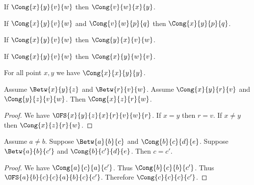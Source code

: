\documentclass[10pt,a4paper,parskip=half,numbers=endperiod,parskip]{scrartcl}
\begin{document}
  \begin{forthel}
    \begin{lemma} %
      If $\Cong{x}{y}{v}{w}$
      then $\Cong{v}{w}{x}{y}$.
    \end{lemma}
  \end{forthel}


  \begin{forthel}
    \begin{lemma} %
      If $\Cong{x}{y}{v}{w}$ and $\Cong{v}{w}{p}{q}$
      then $\Cong{x}{y}{p}{q}$.
    \end{lemma}
  \end{forthel}

  \begin{forthel}
    \begin{lemma} %
      If $\Cong{x}{y}{v}{w}$
      then $\Cong{y}{x}{v}{w}$.
    \end{lemma}

    \begin{lemma} %
      If $\Cong{x}{y}{v}{w}$
      then $\Cong{x}{y}{w}{v}$.
    \end{lemma}
  \end{forthel}

  \begin{forthel}
    \begin{lemma} %
      For all point $x, y$ we have $\Cong{x}{x}{y}{y}$.
    \end{lemma}
  \end{forthel}


  \begin{forthel}
    \begin{lemma} %
      Assume $\Betw{x}{y}{z}$ and $\Betw{r}{v}{w}$.
      Assume $\Cong{x}{y}{r}{v}$ and $\Cong{y}{z}{v}{w}$.
      Then $\Cong{x}{z}{r}{w}$.
    \end{lemma}
    \begin{proof}
      We have $\OFS{x}{y}{z}{x}{r}{v}{w}{r}$. %
      If $x = y$ then $r = v$.                %
      If $x \neq y$ then $\Cong{x}{z}{r}{w}$. %
    \end{proof}
  \end{forthel}



  \begin{forthel}
    \begin{lemma} %
      Assume $a \neq b$.
      Suppose $\Betw{a}{b}{c}$ and $\Cong{b}{c}{d}{e}$.
      Suppose $\Betw{a}{b}{c'}$ and $\Cong{b}{c'}{d}{e}$.
      Then $c = c'$.
    \end{lemma}
    \begin{proof}
      We have $\Cong{a}{c}{a}{c'}$.
      Thus $\Cong{b}{c}{b}{c'}$.
      Thus $\OFS{a}{b}{c}{c}{a}{b}{c}{c'}$.
      Therefore $\Cong{c}{c}{c}{c'}$.
    \end{proof}
  \end{forthel}
\end{document}
